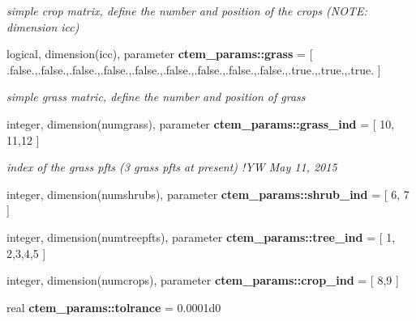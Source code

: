 \begin{DoxyCompactItemize}
\begin{DoxyCompactList}\small\item\em simple crop matrix, define the number and position of the crops (N\+O\+T\+E\+: dimension icc) \end{DoxyCompactList}\item 
\hypertarget{namespacectem__params_aa3cfb14989b4145f054926e8eea3382f}{}logical, dimension(icc), parameter {\bfseries ctem\+\_\+params\+::grass} = \mbox{[} .false.,.false.,.false.,.false.,.false.,.false.,.false.,.false.,.false.,.true.,.true.,.true. \mbox{]}\label{namespacectem__params_aa3cfb14989b4145f054926e8eea3382f}

\begin{DoxyCompactList}\small\item\em simple grass matric, define the number and position of grass \end{DoxyCompactList}\item 
\hypertarget{namespacectem__params_ac0e6330dd6b8408f75fb25c1a7aa7fcb}{}integer, dimension(numgrass), parameter {\bfseries ctem\+\_\+params\+::grass\+\_\+ind} = \mbox{[} 10, 11,12 \mbox{]}\label{namespacectem__params_ac0e6330dd6b8408f75fb25c1a7aa7fcb}

\begin{DoxyCompactList}\small\item\em index of the grass pfts (3 grass pfts at present) !\+Y\+W May 11, 2015 \end{DoxyCompactList}\item 
\hypertarget{namespacectem__params_aec72ba91dc7f74a089a1dfd41f940640}{}integer, dimension(numshrubs), parameter {\bfseries ctem\+\_\+params\+::shrub\+\_\+ind} = \mbox{[} 6, 7 \mbox{]}\label{namespacectem__params_aec72ba91dc7f74a089a1dfd41f940640}

\item 
\hypertarget{namespacectem__params_a0e1c44fcb6eedc488eba03f610e542dd}{}integer, dimension(numtreepfts), parameter {\bfseries ctem\+\_\+params\+::tree\+\_\+ind} = \mbox{[} 1, 2,3,4,5 \mbox{]}\label{namespacectem__params_a0e1c44fcb6eedc488eba03f610e542dd}

\item 
\hypertarget{namespacectem__params_acc6cbb656e34f04ef6d29df9e3418bb3}{}integer, dimension(numcrops), parameter {\bfseries ctem\+\_\+params\+::crop\+\_\+ind} = \mbox{[} 8,9 \mbox{]}\label{namespacectem__params_acc6cbb656e34f04ef6d29df9e3418bb3}

\item 
\hypertarget{namespacectem__params_a0556fbcb62b10a6e390157c628d227d1}{}real {\bfseries ctem\+\_\+params\+::tolrance} = 0.\+0001d0\label{namespacectem__params_a0556fbcb62b10a6e390157c628d227d1}


\end{DoxyCompactItemize}
